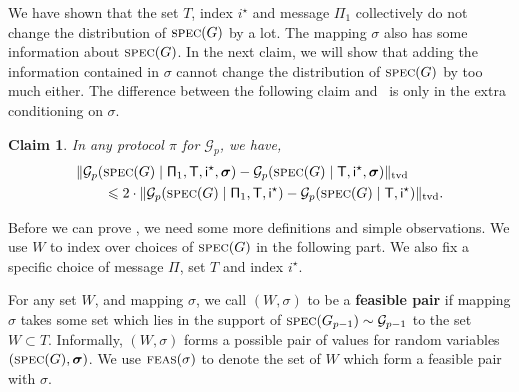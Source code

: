 \documentclass[11pt]{article}
\newtheorem{claim}[lemma]{Claim}
\theoremstyle{definition}
\renewcommand{\leq}{\leqslant}
\newcommand{\tvd}[2]{\ensuremath{\norm{#1 - #2}_{\mathrm{tvd}}}}
\newcommand{\norm}[1]{\ensuremath{\|#1\|}}
\newcommand{\rv}[1]{\ensuremath{{\mathsf{#1}}}\xspace}
\newcommand{\cG}{\ensuremath{\mathcal{G}}}
\newcommand{\spec}{\ensuremath{\textnormal{\textsc{spec}}}}
\newcommand{\istar}{\ensuremath{i^{\star}}}
\newcommand{\prot}{\ensuremath{\pi}}
\newcommand{\Prot}{\ensuremath{\Pi}}
\newcommand{\rProt}{\ensuremath{\rv{\Prot}}}
\newcommand{\rT}{\ensuremath{\rv{T}}}
\newcommand{\rsigma}{\ensuremath{\bm{\sigma}}}
\begin{document}
	We have shown that the set $T$, index $\istar$ and message $\Prot_1$ collectively do not change the distribution of $\spec(G) $ by a lot. The mapping $\sigma$ also has some information about $\spec(G)$. In the next claim, we will show that adding the information contained in $\sigma$ cannot change the distribution of $\spec(G)$ by too much either. The difference between the following claim and~ is only in the extra conditioning on $\sigma$. 
	
	\begin{claim}\label{clm:spec-set-add-sigma}
		In any protocol $\prot$ for $\cG_p$, we have, 
		\begin{align*}
			&	\tvd{\cG_p(\spec(G) \mid \rProt_1, \rT, \ristar, \rsigma)}{\cG_p(\spec(G) \mid \rT, \ristar, \rsigma)}\\
			&\hspace{20pt} \leq 2 \cdot \tvd{\cG_p(\spec(G) \mid \rProt_1, \rT, \ristar)}{\cG_p(\spec(G) \mid \rT, \ristar)}. 
		\end{align*}
	\end{claim}
	
	\newcommand{\feas}{\ensuremath{\textnormal{\textsc{feas}}}}
	
	Before we can prove , we need some more definitions and simple observations. 
	We use $W$ to index over choices of $\spec(G)$ in the following part. We also fix a specific choice of message $\Prot$, set $T$ and index $\istar$.
	
	For any set $W$, and mapping $\sigma$, we call $(W, \sigma)$ to be a \textbf{feasible pair} if mapping $\sigma$ takes some set which lies in the support of $\spec(G_{p-1}) \sim \cG_{p-1}$ to the set $W \subset T$. Informally, $(W, \sigma)$ forms a possible pair of values for random variables $(\spec(G), \rsigma)$. We use $\feas(\sigma)$ to denote the set of $W$ which form a feasible pair with $\sigma$.
	
\end{document}
